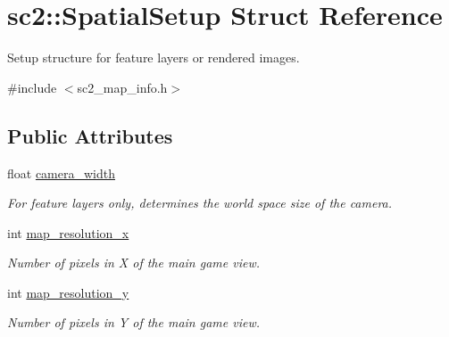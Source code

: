 \hypertarget{structsc2_1_1_spatial_setup}{}\section{sc2\+:\+:Spatial\+Setup Struct Reference}
\label{structsc2_1_1_spatial_setup}


Setup structure for feature layers or rendered images.  




{\ttfamily \#include $<$sc2\+\_\+map\+\_\+info.\+h$>$}

\subsection*{Public Attributes}
\begin{DoxyCompactItemize}
\item 
\mbox{\label{structsc2_1_1_spatial_setup_a601930f7ac562ccfc63bda24e04cc384}} 
float \hyperlink{structsc2_1_1_spatial_setup_a601930f7ac562ccfc63bda24e04cc384}{camera\+\_\+width}
\begin{DoxyCompactList}\small\item\em For feature layers only, determines the world space size of the camera. \end{DoxyCompactList}\item 
\mbox{\label{structsc2_1_1_spatial_setup_a6b238b3ed5fd2d5d4f15dd096051d7ce}} 
int \hyperlink{structsc2_1_1_spatial_setup_a6b238b3ed5fd2d5d4f15dd096051d7ce}{map\+\_\+resolution\+\_\+x}
\begin{DoxyCompactList}\small\item\em Number of pixels in X of the main game view. \end{DoxyCompactList}\item 
\mbox{\label{structsc2_1_1_spatial_setup_ae9e4415838b159f4a06a63af47fa148e}} 
int \hyperlink{structsc2_1_1_spatial_setup_ae9e4415838b159f4a06a63af47fa148e}{map\+\_\+resolution\+\_\+y}
\begin{DoxyCompactList}\small\item\em Number of pixels in Y of the main game view. \end{DoxyCompactList}\item 
\mbox{\label{structsc2_1_1_spatial_setup_aab77c57499ded735dfd268f710ae31b1}} 

\end{DoxyCompactItemize}
